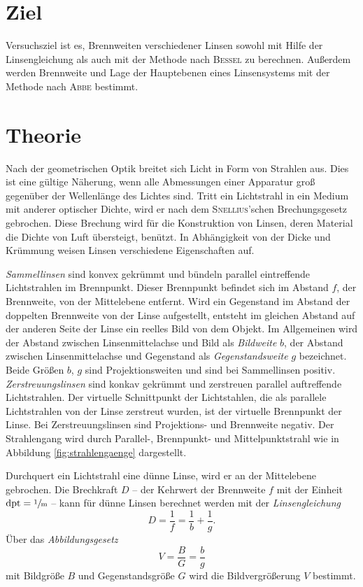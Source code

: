 \section{Ziel}
\label{sec:Ziel}

Versuchsziel ist es, Brennweiten verschiedener Linsen sowohl mit Hilfe der Linsengleichung als auch mit der Methode nach \textsc{Bessel} zu berechnen. 
Außerdem werden Brennweite und Lage der Hauptebenen eines Linsensystems mit der Methode nach \textsc{Abbe} bestimmt.
\section{Theorie}
\label{sec:Theorie}
Nach der geometrischen Optik breitet sich Licht in Form von Strahlen aus. 
Dies ist eine gültige Näherung, wenn alle Abmessungen einer Apparatur groß gegenüber der Wellenlänge des Lichtes sind. 
Tritt ein Lichtstrahl in ein Medium mit anderer optischer Dichte, wird er nach dem \textsc{Snellius}'schen Brechungsgesetz gebrochen. 
Diese Brechung wird für die Konstruktion von Linsen, deren Material die Dichte von Luft übersteigt, benützt.
In Abhängigkeit von der Dicke und Krümmung weisen Linsen verschiedene Eigenschaften auf. 

\emph{Sammellinsen} sind konvex gekrümmt und bündeln parallel eintreffende Lichtstrahlen im Brennpunkt. Dieser Brennpunkt befindet sich im Abstand $f$, der Brennweite, von der Mittelebene entfernt. 
Wird ein Gegenstand im Abstand der doppelten Brennweite von der Linse aufgestellt, entsteht im gleichen Abstand auf der anderen Seite der Linse ein reelles Bild von dem Objekt. 
Im Allgemeinen wird der Abstand zwischen Linsenmittelachse und Bild als \emph{Bildweite} $b$, der Abstand zwischen Linsenmittelachse und Gegenstand als \emph{Gegenstandsweite} $g$ bezeichnet. 
Beide Größen $b$, $g$ sind Projektionsweiten und sind bei Sammellinsen positiv.\\
\emph{Zerstreuungslinsen} sind konkav gekrümmt und zerstreuen parallel auftreffende Lichtstrahlen. 
Der virtuelle Schnittpunkt der Lichtstahlen, die als parallele Lichtstrahlen von der Linse zerstreut wurden, ist der virtuelle Brennpunkt der Linse.
Bei Zerstreuungslinsen sind Projektions- und Brennweite negativ.
Der Strahlengang wird durch Parallel-, Brennpunkt- und Mittelpunktstrahl wie in Abbildung \ref{fig:strahlengaenge} dargestellt.

Durchquert ein Lichtstrahl eine dünne Linse, wird er an der Mittelebene gebrochen.
Die Brechkraft $D$ -- der Kehrwert der Brennweite $f$ mit der Einheit $ \mathrm{dpt}=\sfrac{1}{\si{\meter}}$ -- kann für dünne Linsen berechnet werden mit der \emph{Linsengleichung}
\begin{equation}
	D=\frac{1}{f}=\frac{1}{b}+\frac{1}{g}.
\end{equation}
Über das \emph{Abbildungsgesetz} 
\begin{equation}
	V=\frac{B}{G}=\frac{b}{g}
\end{equation}
mit Bildgröße $B$ und Gegenstandsgröße $G$ wird die Bildvergrößerung $V$ bestimmt.

